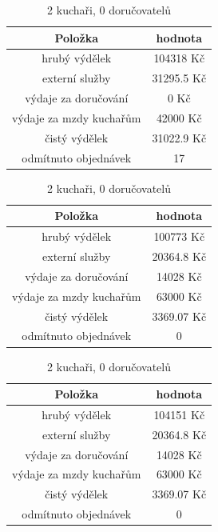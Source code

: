 \documentclass[a4paper, 11pt]{article}
\begin{document}
\begin{table}[h]
\centering
\begin{tabular}{cc}
\textbf{Položka} & \textbf{hodnota}                                                                                   \\ \hline
hrubý výdělek & 104318 Kč \\ \hline
externí služby  & 31295.5 Kč \\ \hline                      
výdaje za doručování &  0 Kč \\ \hline
výdaje za mzdy kuchařům &  42000 Kč \\ \hline
čistý výdělek &  31022.9 Kč \\ \hline
odmítnuto objednávek & 17
\end{tabular}
\caption{2 kuchaři, 0 doručovatelů}
\end{table}

\begin{table}[h]
\centering
\begin{tabular}{cc}
\textbf{Položka} & \textbf{hodnota}                                                                                   \\ \hline
hrubý výdělek & 100773 Kč \\ \hline
externí služby  & 20364.8 Kč \\ \hline                      
výdaje za doručování &  14028 Kč \\ \hline
výdaje za mzdy kuchařům &  63000 Kč \\ \hline
čistý výdělek &  3369.07 Kč \\ \hline
odmítnuto objednávek & 0
\end{tabular}
\caption{2 kuchaři, 0 doručovatelů}
\end{table}

\begin{table}[h]
\centering
\begin{tabular}{cc}
\textbf{Položka} & \textbf{hodnota}                                                                                   \\ \hline
hrubý výdělek & 104151 Kč \\ \hline
externí služby  & 20364.8 Kč \\ \hline                      
výdaje za doručování &  14028 Kč \\ \hline
výdaje za mzdy kuchařům &  63000 Kč \\ \hline
čistý výdělek &  3369.07 Kč \\ \hline
odmítnuto objednávek & 0
\end{tabular}
\caption{2 kuchaři, 0 doručovatelů}
\end{table}
\end{document}

